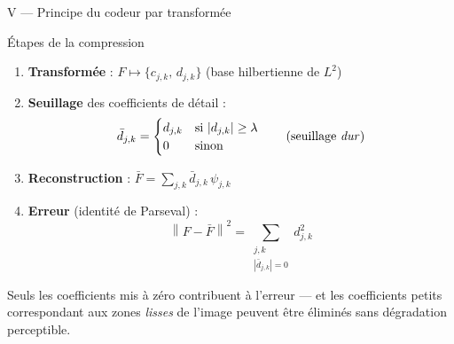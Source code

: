 \documentclass[10pt]{beamer}
\newcommand{\norme}[1]{\left\| #1 \right\|}
\begin{document}
	\begin{frame}{V — Principe du codeur par transformée}
		
		\begin{block}{Étapes de la compression}
			\begin{enumerate}
				\item \textbf{Transformée} : $F \mapsto \{c_{j,k},\, d_{j,k}\}$
				(base hilbertienne de $L^2$)
				\item \textbf{Seuillage} des coefficients de détail :
				\[
				\bar{d}_{j,k} =
				\begin{cases}
					d_{j,k} & \text{si } |d_{j,k}| \geq \lambda \\
					0        & \text{sinon}
				\end{cases}
				\qquad \text{(seuillage \emph{dur})}
				\]
				\item \textbf{Reconstruction} : $\bar{F} = \sum_{j,k} \bar{d}_{j,k}\,\psi_{j,k}$
				\item \textbf{Erreur} (identité de Parseval) :
				\[
				\norme{F - \bar{F}}^2 = \sum_{\substack{j,k\\|\bar{d}_{j,k}|=0}} d_{j,k}^2
				\]
			\end{enumerate}
		\end{block}
		
		\medskip
		Seuls les coefficients mis à zéro contribuent à l'erreur — et les
		coefficients petits correspondant aux zones \emph{lisses} de l'image
		peuvent être éliminés sans dégradation perceptible.
		
	\end{frame}
	
\end{document}
